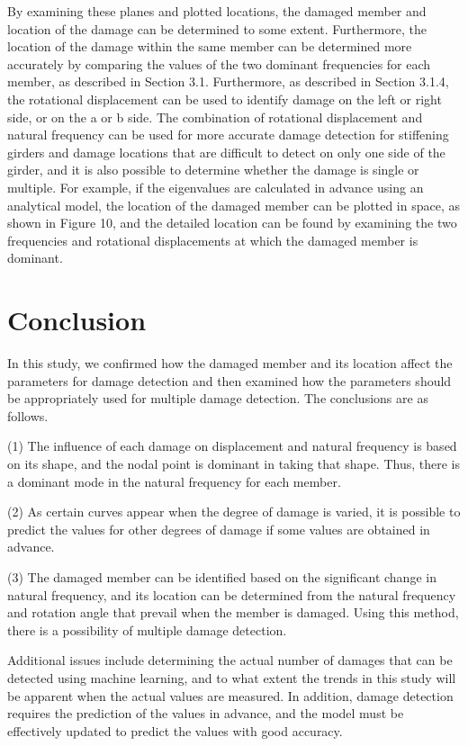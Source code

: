\documentclass{proc-a4}
\begin{document}
By examining these planes and plotted locations, the damaged member and location of the damage can be determined to some extent. Furthermore, the location of the damage within the same member can be determined more accurately by comparing the values of the two dominant frequencies for each member, as described in Section 3.1. Furthermore, as described in Section 3.1.4, the rotational displacement can be used to identify damage on the left or right side, or on the a or b side. The combination of rotational displacement and natural frequency can be used for more accurate damage detection for stiffening girders and damage locations that are difficult to detect on only one side of the girder, and it is also possible to determine whether the damage is single or multiple. For example, if the eigenvalues are calculated in advance using an analytical model, the location of the damaged member can be plotted in space, as shown in Figure 10, and the detailed location can be found by examining the two frequencies and rotational displacements at which the damaged member is dominant.

\section{Conclusion}
In this study, we confirmed how the damaged member and its location affect the parameters for damage detection and then examined how the parameters should be appropriately used for multiple damage detection. The conclusions are as follows.\\\noindent

\noindent(1) The influence of each damage on displacement and natural frequency is based on its shape, and the nodal point is dominant in taking that shape. Thus, there is a dominant mode in the natural frequency for each member.\\\noindent

\noindent(2) As certain curves appear when the degree of damage is varied, it is possible to predict the values for other degrees of damage if some values are obtained in advance.\\\noindent

\noindent(3) The damaged member can be identified based on the significant change in natural frequency, and its location can be determined from the natural frequency and rotation angle that prevail when the member is damaged. Using this method, there is a possibility of multiple damage detection.\\\noindent

\noindent Additional issues include determining the actual number of damages that can be detected using machine learning, and to what extent the trends in this study will be apparent when the actual values are measured. In addition, damage detection requires the prediction of the values in advance, and the model must be effectively updated to predict the values with good accuracy.


\end{document}
